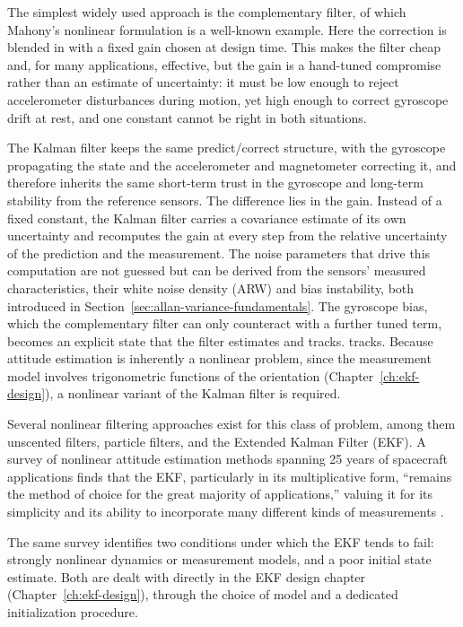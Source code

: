 \documentclass[12pt,a4paper]{article}
\begin{document}
The simplest widely used approach is the complementary filter, of
which Mahony's nonlinear formulation \citep{mahony2008nonlinear} is
a well-known example. Here the correction is blended in with a
fixed gain chosen at design time. This makes the filter cheap and,
for many applications, effective, but the gain is a hand-tuned
compromise rather than an estimate of uncertainty: it must be low
enough to reject accelerometer disturbances during motion, yet high
enough to correct gyroscope drift at rest, and one constant cannot
be right in both situations.

The Kalman filter keeps the same predict/correct structure, with
the gyroscope propagating the state and the accelerometer and
magnetometer correcting it, and therefore inherits the same
short-term trust in the gyroscope and long-term stability from the
reference sensors. The difference lies in the gain. Instead of a
fixed constant, the Kalman filter carries a covariance estimate of
its own uncertainty and recomputes the gain at every step from the
relative uncertainty of the prediction and the measurement. The
noise parameters that drive this computation are not guessed but
can be derived from the sensors' measured characteristics, their white
noise density (ARW) and bias instability, both introduced in
Section~\ref{sec:allan-variance-fundamentals}. The gyroscope bias,
which the complementary filter can only counteract with a further
tuned term, becomes an explicit state that the filter estimates and
tracks. tracks. Because attitude estimation is inherently a nonlinear
problem, since the measurement model involves trigonometric
functions of the orientation (Chapter~\ref{ch:ekf-design}), a
nonlinear variant of the Kalman filter is required.

Several nonlinear filtering approaches exist for this class of
problem, among them unscented filters, particle filters, and the
Extended Kalman Filter (EKF). A survey of nonlinear attitude
estimation methods spanning 25 years of spacecraft applications
finds that the EKF, particularly in its multiplicative form,
``remains the method of choice for the great majority of
applications,'' valuing it for its simplicity and its ability to
incorporate many different kinds of measurements
\citep{crassidis2007survey}.

The same survey identifies two conditions under which the EKF tends
to fail: strongly nonlinear dynamics or measurement models, and a
poor initial state estimate. Both are dealt with directly in the EKF
design chapter (Chapter~\ref{ch:ekf-design}), through the choice of
model and a dedicated initialization procedure.
\end{document}

